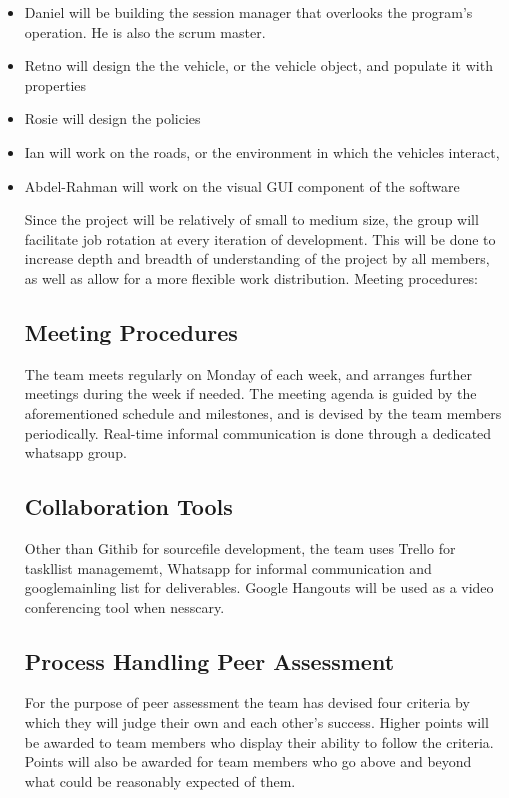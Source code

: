 \documentclass[11pt]{article}
\begin{document}
	\begin{itemize}
		\item Daniel will be building the session manager that overlooks the program’s operation. He is also the scrum master.
		\item Retno will design the the vehicle, or the vehicle object, and populate it with properties
		\item Rosie will design the policies
		\item Ian will work on the roads, or the environment in which the vehicles interact,
		\item Abdel-Rahman will work on the visual GUI component of the software


Since the project will be relatively of small to medium size, the group will facilitate job rotation at every iteration of development. This will be done to increase depth and breadth of understanding of the project by all members, as well as allow for a more flexible work distribution. 
Meeting procedures:
\subsection{Meeting Procedures}


The team meets regularly on Monday of each week, and arranges further meetings during the week if needed. The meeting agenda is guided by the aforementioned schedule and milestones, and is devised by the team members periodically. Real-time informal communication is done through a dedicated whatsapp group.

\subsection{Collaboration Tools}

Other than Githib for sourcefile development, the team uses Trello for taskllist managememt, Whatsapp for informal communication and googlemainling list for deliverables. Google Hangouts will be used as a video conferencing tool when nesscary.


\subsection{Process Handling Peer Assessment}
For the purpose of peer assessment the team has devised four criteria by which they will judge their own
and each other's success. Higher points will be awarded to team members who display their ability to follow the criteria. Points will also be awarded for team members who go above and beyond what could be reasonably expected of them.


\end{itemize}
\end{document}
